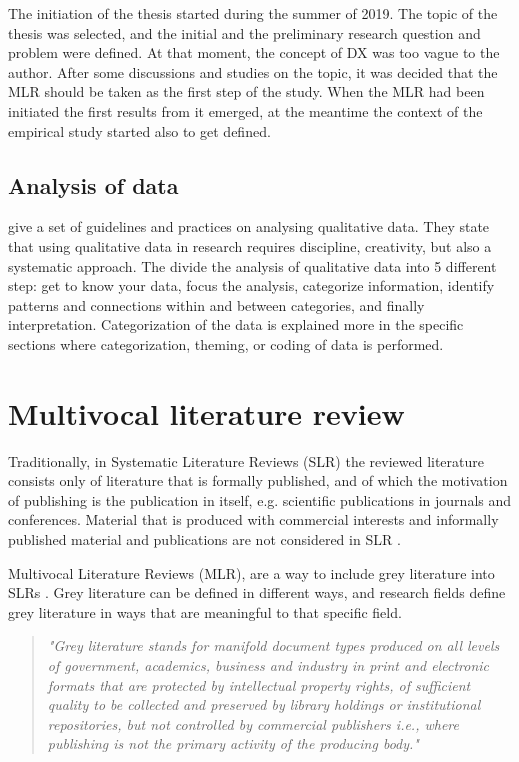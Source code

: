 \documentclass[english, 12pt, a4paper, sci, utf8, a-1b, online]{aaltothesis}
\begin{document}
The initiation of the thesis started during the summer of 2019. The topic of the thesis was selected, and the initial and the preliminary research question and problem were defined. At that moment, the concept of DX was too vague to the author. After some discussions and studies on the topic, it was decided that the MLR should be taken as the first step of the study. When the MLR had been initiated the first results from it emerged, at the meantime the context of the empirical study started also to get defined.

\subsection{Analysis of data}

\textcite{analyzing-qualitative-data} give a set of guidelines and practices on analysing qualitative data. They state that using qualitative data in research requires discipline, creativity, but also a systematic approach. The divide the analysis of qualitative data into 5 different step: get to know your data, focus the analysis, categorize information, identify patterns and connections within and between categories, and finally interpretation. Categorization of the data is explained more in the specific sections where categorization, theming, or coding of data is performed.

\clearpage
\section{Multivocal literature review} \label{mlr}

Traditionally, in Systematic Literature Reviews (SLR) the reviewed literature consists only of literature that is formally published, and of which the motivation of publishing is the publication in itself, e.g. scientific publications in journals and conferences. Material that is produced with commercial interests and informally published material and publications are not considered in SLR \parencite{guidelines-for-MLR}.

Multivocal Literature Reviews (MLR), are a way to include grey literature into SLRs \parencite{the-need-for-MLR}. Grey literature can be defined in different ways, and research fields define grey literature in ways that are meaningful to that specific field.

\begin{quotation}
  \textit{"Grey literature stands for manifold document types produced on all levels of government, academics, business and industry in print and electronic formats that are protected by intellectual property rights, of sufficient quality to be collected and preserved by library holdings or institutional repositories, but not controlled by commercial publishers i.e., where publishing is not the primary activity of the producing body."} \parencite{towards-a-prague-definition-of-grey-literature}
\end{quotation}
\end{document}
